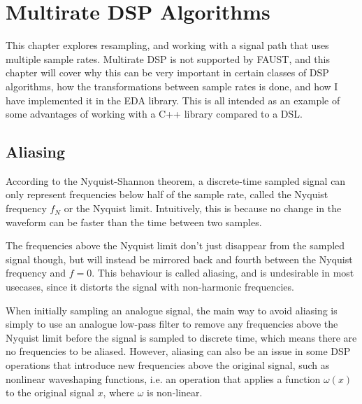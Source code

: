 \chapter{Multirate DSP Algorithms}
\label{chap:multirate}

This chapter explores resampling, and working with a signal path that uses multiple sample rates. Multirate
DSP is not supported by FAUST\autocite{faustwebsite}, and this chapter will cover why this can be very
important in certain classes of DSP algorithms, how the transformations between sample rates is done, and how
I have implemented it in the EDA library. This is all intended as an example of some advantages of working
with a C++ library compared to a DSL.

\section{Aliasing}

According to the Nyquist-Shannon theorem\autocite{shannon49}, a discrete-time sampled signal can only
represent frequencies below half of the sample rate, called the Nyquist frequency $f_N$ or
the Nyquist limit. Intuitively, this is because no change in the waveform can be faster than the time between
two samples.

The frequencies above the Nyquist limit don't just disappear from the sampled signal though, but will instead
be mirrored back and fourth between the Nyquist frequency and $f = 0$. This behaviour is
called aliasing, and is undesirable in most usecases, since it distorts the signal with non-harmonic
frequencies.

When initially sampling an analogue signal, the main way to avoid aliasing is simply to use an analogue
low-pass filter to remove any frequencies above the Nyquist limit before the signal is sampled to discrete
time\autocite{an699},  which means there are no frequencies to be aliased. However, aliasing can also
be an issue in some DSP operations that introduce new frequencies above the original signal, such as
nonlinear waveshaping functions, i.e. an operation that applies a function $\omega(x)$ to the
original signal $x$, where $\omega$ is non-linear.

